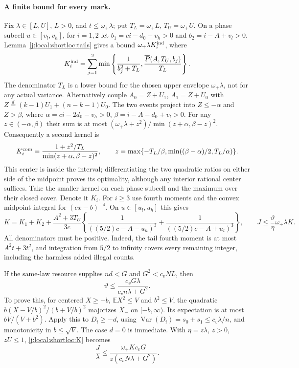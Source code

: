 \paragraph{A finite bound for every mark.}
Fix $\lambda\in[L,U]$, $L>0$, and $t\le\omega_+\lambda$; put
$T_L=\omega_+L$, $T_U=\omega_+U$. On a phase subcell $u\in[v_l,v_h]$,
for $i=1,2$ let $b_1=ci-d_0-v_h>0$ and $b_2=i-A+v_l>0$.
Lemma~\ref{j:local:shortloc:tails} gives a bound $\omega_+\lambda K_i^{\rm ind}$,
where
\[
 K_i^{\rm ind}=\sum_{j=1}^2\min\left\{\frac1{b_j^2+T_L},
                          \frac{\overline P(A,T_U,b_j)}{T_L}\right\}.
\]
The denominator $T_L$ is a lower bound for the chosen upper envelope
$\omega_+\lambda$, not for any actual variance.
Alternatively couple $A_0=Z+U_1$, $A_1=Z+U_0$ with
$Z\overset d=(k-1)U_1+(n-k-1)U_0$. The two events project into
$Z\le-\alpha$ and $Z>\beta$, where
$\alpha=ci-2d_0-v_h>0$, $\beta=i-A-d_0+v_l>0$.
For any $z\in(-\alpha,\beta)$ their sum is at most
$(\omega_+\lambda+z^2)/\min(z+\alpha,\beta-z)^2$.
Consequently a second kernel is
\[
 K_i^{\rm com}=\frac{1+z^2/T_L}{\min(z+\alpha,\beta-z)^2},\qquad
 z=\max\{-T_L/\beta,\min((\beta-\alpha)/2,T_L/\alpha)\}.
\]
This center is inside the interval; differentiating the two quadratic
ratios on either side of the midpoint proves its optimality, although
any interior rational center suffices. Take the smaller kernel on each
phase subcell and the maximum over their closed cover. Denote it $K_i$.
For $i\ge3$ use fourth moments and the convex midpoint integral for
$(cx-b)^{-4}$. On $u\in[u_l,u_h]$ this gives
\begin{equation}\label{j:local:shortloc:K}
 K=K_1+K_2+\frac{A^2+3T_U}{3c}
  \left\{\frac1{((5/2)c-A-u_h)^3}
                 +\frac1{((5/2)c-A+u_l)^3}\right\},\qquad
 J\le\frac{\vartheta}{\eta}\omega_+\lambda K.
\end{equation}
All denominators must be positive. Indeed, the tail fourth moment is at
most $A^2t+3t^2$, and integration from $5/2$ to infinity covers every
remaining integer, including the harmless added illegal counts.

If the same-law resource supplies $nd<G$ and
$G^2<c_vNL$, then
\begin{equation}\label{j:local:shortloc:theta}
 \vartheta\le\frac{c_vG\lambda}{c_vn\lambda+G^2}.
\end{equation}
To prove this, for centered $X\ge-b$, $\mathbb EX^2\le V$ and $b^2\le V$,
the quadratic $b(X-V/b)^2/(b+V/b)^2$ majorizes $X_-$ on $[-b,\infty)$.
Its expectation is at most $bV/(V+b^2)$. Apply this to $D_i\ge-d$,
using $\operatorname{Var}(D_i)=s_0+s_1\le c_v\lambda/n$, and monotonicity
in $b\le\sqrt V$. The case $d=0$ is immediate. With $\eta=z\lambda$,
$z>0$, $zU\le1$, \eqref{j:local:shortloc:K} becomes
\begin{equation}\label{j:local:shortloc:Jfinal}
 \frac J\lambda\le\frac{\omega_+Kc_vG}{z(c_vN\lambda+G^2)}.
\end{equation}

